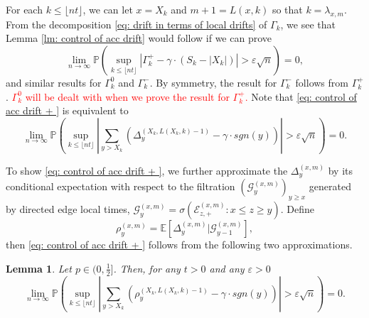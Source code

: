 \documentclass[twoside,12pt, a4paper]{article}
\newtheorem{lemma}{Lemma}[section]
\numberwithin{equation}{section}
\theoremstyle{remark}
\newcommand{\abs}[1]{\left\vert #1 \right\vert}
\newcommand{\edt}[1]{\textcolor{red}{#1}} %
\newcommand{\comment}[1]{\textcolor{blue}{(Comment: #1)}}
\begin{document}
	For each $k\leq \lfloor nt\rfloor$, we can let $x = X_k$ and $ m +1=L(x,k)$ so that $k = \lambda_{x,m}$. From the decomposition \eqref{eq: drift in terms of local drifts} of $\Gamma_k$, we see that
	Lemma \ref{lm: control of acc drift} would follow if we can prove
	\begin{equation}\label{eq: control of acc drift + }
		\lim_{n \to \infty }\mathbb{P}\left(\sup_{k\leq\lfloor nt \rfloor} \abs{\Gamma^+_k - \gamma \cdot \left(S_k - \abs{X_k} \right)   } > \varepsilon \sqrt{n}  \right) =0, 
	\end{equation}
	and similar results for $\Gamma_k^0$ and $\Gamma_k^-$. By symmetry, the result for $\Gamma_k^-$ follows from $\Gamma_k^+$. 
	\edt{$\Gamma_k^0$ will be dealt with when we prove the result for $\Gamma_k^+$.}
	Note that \eqref{eq: control of acc drift + } is equivalent to
	\begin{equation}
		\lim_{n \to \infty }\mathbb{P}\left(\sup_{k\leq\lfloor nt \rfloor} \abs{\sum_{y> X_k} \left( \Delta_{y}^{(X_k,L(X_k,k) - 1)} - \gamma  \cdot sgn(y) \right)   }  > \varepsilon \sqrt{n}  \right) =0. 
	\end{equation}
	
	To show \eqref{eq: control of acc drift + }, we further approximate the $\Delta_{y}^{(x,m)}$ by its conditional expectation with respect to the filtration $\left(\mathcal{G}_{y}^{(x,m)}\right)_{y\geq x}$ generated by directed edge local times, $ \mathcal{G}_{y}^{(x,m)} = \sigma\left( \mathcal{E}^{(x,m)}_{z,+} : x \le z \geq y \right)$.
	Define
	\begin{equation}\label{eq: conditional mean}
		\rho_{y}^{(x,m)}= \mathbb{E}\left[\Delta_y^{(x,m)} | \mathcal{G}_{y-1}^{(x,m)}\right],
	\end{equation}
	then \eqref{eq: control of acc drift + } follows from the following two approximations.
	\begin{lemma}\label{lm: approximation of means of local drift}
		Let $p\in (0,\frac{1}{2}]$. Then, for any $t>0$ and any $\varepsilon >0$
		\begin{equation}\label{eq: control of expected local drift}
			\lim_{n \to \infty }\mathbb{P}\left(\sup_{k\leq\lfloor nt \rfloor} \abs{\sum_{y> X_k} \left( \rho_{y}^{(X_k,L(X_k,k)-1)} - \gamma  \cdot sgn(y) \right)   }  > \varepsilon \sqrt{n}  \right) =0. 
		\end{equation}
	\end{lemma}
	
\end{document}
